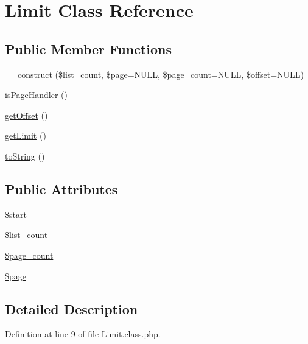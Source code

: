 \hypertarget{classLimit}{\section{Limit Class Reference}
\label{classLimit}
}
\subsection*{Public Member Functions}
\begin{DoxyCompactItemize}
\item 
\hyperlink{classLimit_abaa37cf0bae4ec67f3f933eacedbe73d}{\-\_\-\-\_\-construct} (\$list\-\_\-count, \$\hyperlink{classpage}{page}=N\-U\-L\-L, \$page\-\_\-count=N\-U\-L\-L, \$offset=N\-U\-L\-L)
\item 
\hyperlink{classLimit_a3a30a3752791c509c01ee9b52e774a3c}{is\-Page\-Handler} ()
\item 
\hyperlink{classLimit_a5dfd9d778f1cfbdaee6114f707a82b48}{get\-Offset} ()
\item 
\hyperlink{classLimit_ae46603b46f8e2969e440eaa9c83e4805}{get\-Limit} ()
\item 
\hyperlink{classLimit_a890c6b7ac90174239e7b5452d4887fc0}{to\-String} ()
\end{DoxyCompactItemize}
\subsection*{Public Attributes}
\begin{DoxyCompactItemize}
\item 
\hyperlink{classLimit_a58e5f9abf39a412a992c922b3342d093}{\$start}
\item 
\hyperlink{classLimit_ada4e47bcb26e48b38e5a6eae0c66cf9c}{\$list\-\_\-count}
\item 
\hyperlink{classLimit_a4e9d12866f8d59589273aaf8e50eaccd}{\$page\-\_\-count}
\item 
\hyperlink{classLimit_a4018b14c795cefed6f16b6651ca343dc}{\$page}
\end{DoxyCompactItemize}


\subsection{Detailed Description}


Definition at line 9 of file Limit.\-class.\-php.



